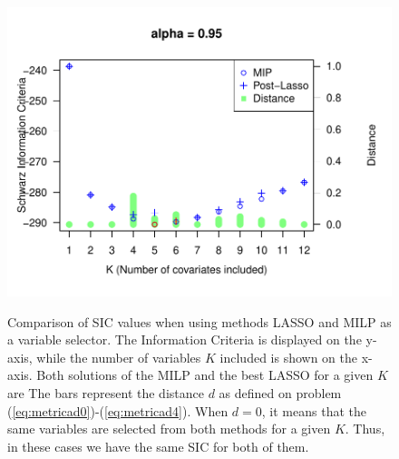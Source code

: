 \begin{figure}
\begin{minipage}[t]{0.4\linewidth}
\begin{minipage}[b]{\linewidth}
			\centering     \includegraphics[width=\textwidth]{Figuras/SIC095.pdf}
			\label{fig:npqar-cross}
		\end{minipage}
	\end{minipage}
	\caption{ {Comparison of SIC values when using methods LASSO and MILP as a variable selector}. The Information Criteria is displayed on the y-axis, while the number of variables $K$ included is shown on the x-axis. Both solutions of the MILP and the best LASSO for a given $K$ are  The bars represent the distance $d$ as defined on problem (\ref{eq:metricad0})-(\ref{eq:metricad4}). When $d=0$, it means that the same variables are selected from both methods for a given $K$. Thus, in these cases we have the same SIC for both of them.}
	\label{fig:comparison-lm-results}
\end{figure}

